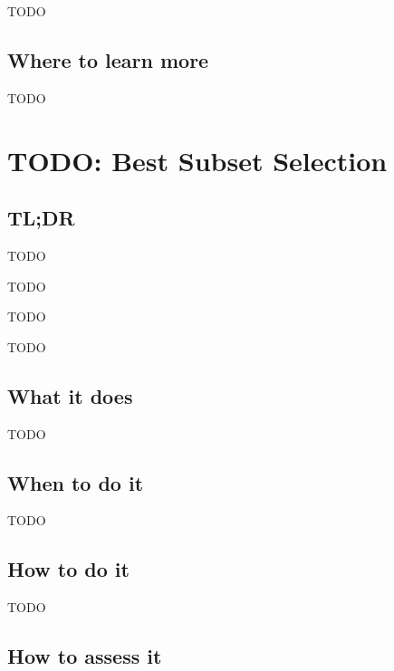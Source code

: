 \documentclass[
]{book}
\providecommand{\tightlist}{%
  \setlength{\itemsep}{0pt}\setlength{\parskip}{0pt}}
\begin{document}
TODO

\hypertarget{where-to-learn-more-9}{%
\section{Where to learn more}\label{where-to-learn-more-9}}

TODO

\hypertarget{best-subset-selection}{%
\chapter{TODO: Best Subset Selection}\label{best-subset-selection}}

\hypertarget{tldr-10}{%
\section{TL;DR}\label{tldr-10}}

\begin{description}
\tightlist
\item[What it does]
TODO
\item[When to do it]
TODO
\item[How to do it]
TODO
\item[How to assess it]
TODO
\end{description}

\hypertarget{what-it-does-10}{%
\section{What it does}\label{what-it-does-10}}

TODO

\hypertarget{when-to-do-it-10}{%
\section{When to do it}\label{when-to-do-it-10}}

TODO

\hypertarget{how-to-do-it-10}{%
\section{How to do it}\label{how-to-do-it-10}}

TODO

\hypertarget{how-to-assess-it-10}{%
\section{How to assess it}\label{how-to-assess-it-10}}
\end{document}
